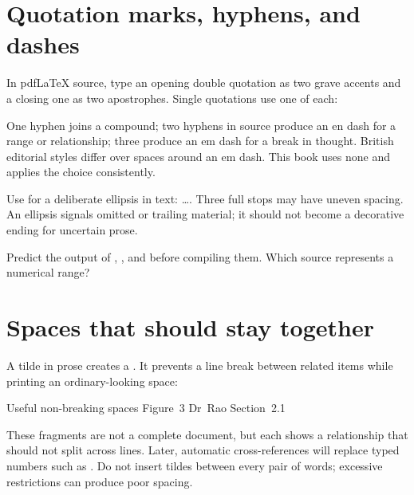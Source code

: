 \section{Quotation marks, hyphens, and dashes}

In pdf\LaTeX{} source, type an opening double quotation as two grave accents and a
closing one as two apostrophes. Single quotations use one of each:


One hyphen joins a compound; two hyphens in source produce an en dash for a
range or relationship; three produce an em dash for a break in thought.
British editorial styles differ over spaces around an em dash. This book uses
none and applies the choice consistently.

Use  for a deliberate ellipsis in text: \ldots. Three full stops
may have uneven spacing. An ellipsis signals omitted or trailing material; it
should not become a decorative ending for uncertain prose.

\begin{pausepredict}
Predict the output of , , and  before
compiling them. Which source represents a numerical range?
\end{pausepredict}

\section{Spaces that should stay together}

A tilde in prose creates a . It prevents a line break
between related items while printing an ordinary-looking space:

\begin{latexcode}{Useful non-breaking spaces}
Figure~3
Dr~Rao
Section~2.1
\end{latexcode}

These fragments are not a complete document, but each shows a relationship
that should not split across lines. Later, automatic cross-references will
replace typed numbers such as . Do not insert tildes between
every pair of words; excessive restrictions can produce poor spacing.

